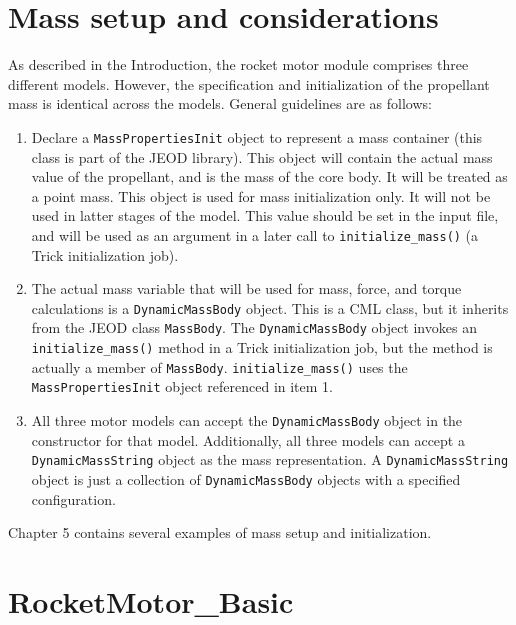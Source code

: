 \documentclass[11pt,fleqn]{report}
\begin{document}
\section{Mass setup and considerations}
As described in the Introduction, the rocket motor module comprises three different models.  However, the specification and initialization of the propellant mass is identical across the models.  General guidelines are as follows:
\begin{enumerate}
\item Declare a \verb|MassPropertiesInit| object to represent a mass container (this class is part of the JEOD library).  This object will contain the actual mass value of the propellant, and is the mass of the core body.  It will be treated as a point mass.  This object is used for mass initialization only.  It will not be used in latter stages of the model.  This value should be set in the input file, and will be used as an argument in a later call to \verb|initialize_mass()| (a Trick initialization job).
\item The actual mass variable that will be used for mass, force, and torque calculations is a \verb|DynamicMassBody| object.  This is a CML class, but it inherits from the JEOD class \verb|MassBody|.  The \verb|DynamicMassBody| object invokes an \verb|initialize_mass()| method in a Trick initialization job, but the method is actually a member of \verb|MassBody|.  \verb|initialize_mass()| uses the \verb|MassPropertiesInit| object referenced in item 1.
\item All three motor models can accept the \verb|DynamicMassBody| object in the constructor for that model.  Additionally, all three models can accept a \verb|DynamicMassString| object as the mass representation.  A \verb|DynamicMassString| object is just a collection of \verb|DynamicMassBody| objects with a specified configuration.
\end{enumerate}
Chapter 5 contains several examples of mass setup and initialization.

\section{RocketMotor\_Basic}
\end{document}
